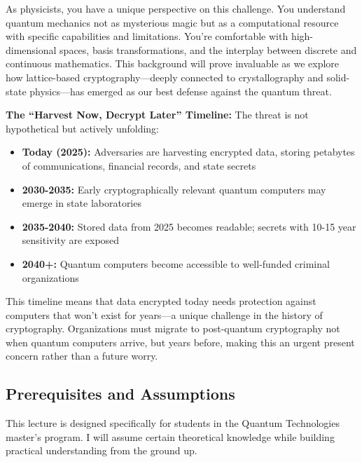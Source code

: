\documentclass[11pt,a4paper]{article}
\begin{document}
As physicists, you have a unique perspective on this challenge. You understand quantum mechanics not as mysterious magic but as a computational resource with specific capabilities and limitations. You're comfortable with high-dimensional spaces, basis transformations, and the interplay between discrete and continuous mathematics. This background will prove invaluable as we explore how lattice-based cryptography---deeply connected to crystallography and solid-state physics---has emerged as our best defense against the quantum threat.

\textbf{The ``Harvest Now, Decrypt Later'' Timeline:} The threat is not hypothetical but actively unfolding:

\begin{itemize}
    \item \textbf{Today (2025):} Adversaries are harvesting encrypted data, storing petabytes of communications, financial records, and state secrets
    \item \textbf{2030-2035:} Early cryptographically relevant quantum computers may emerge in state laboratories
    \item \textbf{2035-2040:} Stored data from 2025 becomes readable; secrets with 10-15 year sensitivity are exposed
    \item \textbf{2040+:} Quantum computers become accessible to well-funded criminal organizations
\end{itemize}

This timeline means that data encrypted today needs protection against computers that won't exist for years---a unique challenge in the history of cryptography. Organizations must migrate to post-quantum cryptography not when quantum computers arrive, but years before, making this an urgent present concern rather than a future worry.

\subsection{Prerequisites and Assumptions}

This lecture is designed specifically for students in the Quantum Technologies master's program. I will assume certain theoretical knowledge while building practical understanding from the ground up.
\end{document}
